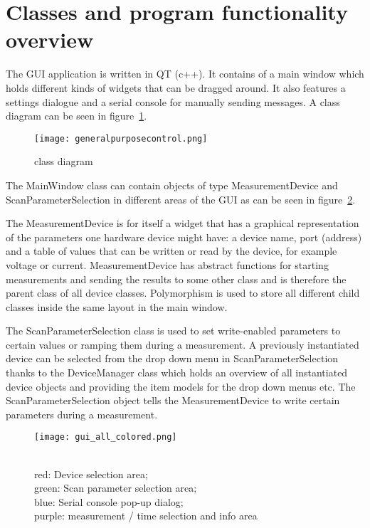 \newpage
\section{Classes and program functionality overview}
The GUI application is written in QT (c++). It contains of a main window which holds different kinds of widgets that can be dragged around. It also features a settings dialogue and a serial console for manually sending messages.
A class diagram can be seen in figure~\ref{fig:classdiagram}.
\par\bigskip
\begin{figure}[h]
	\texttt{[image: generalpurposecontrol.png]}
	\caption{class diagram}
	\label{fig:classdiagram}
\end{figure}
\par\bigskip

The MainWindow class can contain objects of type MeasurementDevice and ScanParameterSelection in different areas of the GUI as can be seen in figure~\ref{fig:guicolored}.\par\bigskip

The MeasurementDevice is for itself a widget that has a graphical representation of the parameters one hardware device might have: a device name, port (address) and a table of values that can be written or read by the device, for example voltage or current. MeasurementDevice has abstract functions for starting measurements and sending the results to some other class and is therefore the parent class of all device classes. Polymorphism is used to store all different child classes inside the same layout in the main window.\par\bigskip

The ScanParameterSelection class is used to set write-enabled parameters to certain values or ramping them during a measurement. A previously instantiated device can be selected from the drop down menu in ScanParameterSelection thanks to the DeviceManager class which holds an overview of all instantiated device objects and providing the item models for the drop down menus etc. The ScanParameterSelection object tells the MeasurementDevice to write certain parameters during a measurement.\par\bigskip
\newpage

\begin{figure}[h]
	\texttt{[image: gui\_all\_colored.png]}
	\caption{\\
		\color{Red}red\color{black}: Device selection area;\\
		\color{Green}green\color{black}: Scan parameter selection area;\\
		\color{Blue}blue\color{black}: Serial console pop-up dialog; \\
		\color{Purple}purple\color{black}: measurement / time selection and info area}
	\label{fig:guicolored}
\end{figure}
\par\bigskip

